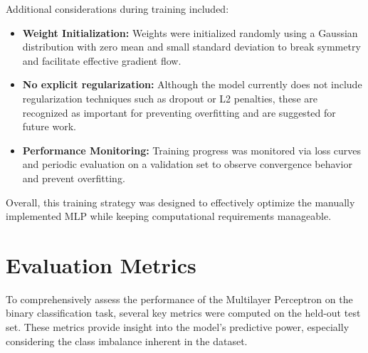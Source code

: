\documentclass[12pt]{article}
\begin{document}
Additional considerations during training included:

\begin{itemize}
    \item \textbf{Weight Initialization:} Weights were initialized randomly using a Gaussian distribution with zero mean and small standard deviation to break symmetry and facilitate effective gradient flow.
    
    \item \textbf{No explicit regularization:} Although the model currently does not include regularization techniques such as dropout or L2 penalties, these are recognized as important for preventing overfitting and are suggested for future work.
    
    \item \textbf{Performance Monitoring:} Training progress was monitored via loss curves and periodic evaluation on a validation set to observe convergence behavior and prevent overfitting.
\end{itemize}

Overall, this training strategy was designed to effectively optimize the manually implemented MLP while keeping computational requirements manageable.


\section{Evaluation Metrics}

To comprehensively assess the performance of the Multilayer Perceptron on the binary classification task, several key metrics were computed on the held-out test set. These metrics provide insight into the model's predictive power, especially considering the class imbalance inherent in the dataset.
\end{document}
